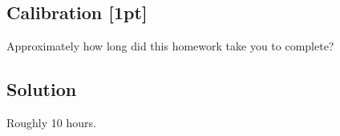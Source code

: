 \documentclass[submit]{harvardml}
\begin{document}
\newpage

\subsection*{Calibration [1pt]}
Approximately how long did this homework take you to complete?

\subsection*{Solution}
Roughly 10 hours.
\end{document}
